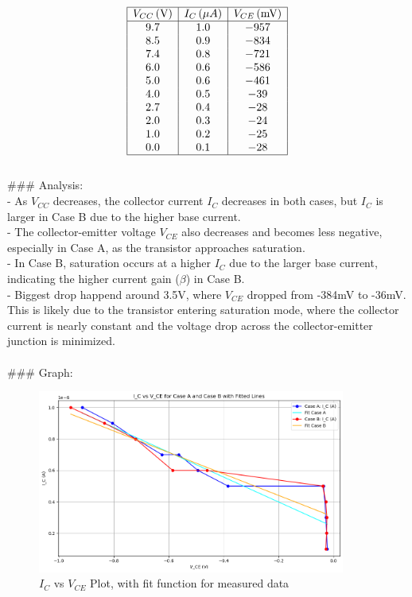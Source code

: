 \documentclass{article}
\begin{document}
\[
\begin{array}{|c|c|c|}
\hline
V_{CC} \, (\text{V}) & I_C \, (\mu A) & V_{CE} \, (\text{mV}) \\
\hline
9.7  & 1.0 & -957 \\
8.5  & 0.9 & -834 \\
7.4  & 0.8 & -721 \\
6.0  & 0.6 & -586 \\
5.0  & 0.6 & -461 \\
4.0  & 0.5 & -39 \\
2.7  & 0.4 & -28 \\
2.0  & 0.3 & -24 \\
1.0  & 0.2 & -25 \\
0.0  & 0.1 & -28 \\
\hline
\end{array}
\]
\\
### Analysis:
\\
- As \( V_{CC} \) decreases, the collector current \( I_C \) decreases in both cases, but \( I_C \) is larger in Case B due to the higher base current.
\\
- The collector-emitter voltage \( V_{CE} \) also decreases and becomes less negative, especially in Case A, as the transistor approaches saturation.
\\
- In Case B, saturation occurs at a higher \( I_C \) due to the larger base current, indicating the higher current gain (\( \beta \)) in Case B.
\\
- Biggest drop happend around 3.5V, where \( V_{CE} \) dropped from -384mV to -36mV. This is likely due to the transistor entering saturation mode, where the collector current is nearly constant and the voltage drop across the collector-emitter junction is minimized.
\\ \\ 
### Graph:
\begin{figure}[H]
    \centering
    \includegraphics[width=0.9\textwidth]{./img/Lab5_2Plot.png}
    \caption{\(I_{C} \) vs \( V_{CE} \) Plot, with fit function for measured data}
    \label{fig:graph1} 
\end{figure}
\\ \\ 
\end{document}
